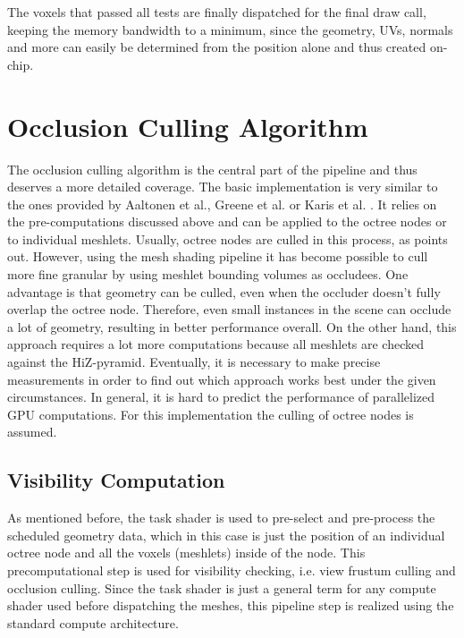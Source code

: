 \noindent
The voxels that passed all tests are finally dispatched for the final draw call, keeping the memory bandwidth to a minimum, 
since the geometry, UVs, normals and more can easily be determined from the position alone and thus created on-chip. \\


\section{Occlusion Culling Algorithm} \label{sec-occlusion}

The occlusion culling algorithm is the central part of the pipeline and thus deserves a more detailed coverage. The 
basic implementation is very similar to the ones provided by Aaltonen et al., Greene et al. or Karis et al. 
\cite{Aaltonen2015,Greene93,Karis2021}. It relies on the pre-computations discussed above and can be applied to the 
octree nodes or to individual meshlets. Usually, octree nodes are culled in this process, as \cite{AkenineMoeller2018}
points out. However, using the mesh shading pipeline it has become possible to cull more fine granular by using 
meshlet bounding volumes as occludees. One advantage is that geometry can be culled, even when the occluder doesn't 
fully overlap the octree node. Therefore, even small instances in the scene can occlude a lot of geometry, resulting 
in better performance overall. On the other hand, this approach requires a lot more computations because all meshlets 
are checked against the \ac{HiZ}-pyramid. Eventually, it is necessary to make precise measurements in order to find out 
which approach works best under the given circumstances. In general, it is hard to predict the performance of 
parallelized \ac{GPU} computations. For this implementation the culling of octree nodes is assumed. 

\subsection*{Visibility Computation} \label{subsec-visibility-computation}

As mentioned before, the task shader is used to pre-select and pre-process the scheduled geometry data, 
which in this case is just the position of an individual octree node and all the voxels (meshlets) inside of the 
node. This precomputational step is used for visibility checking, i.e. view frustum culling and occlusion culling. 
Since the task shader is just a general term for any compute shader used before dispatching the meshes, 
this pipeline step is realized using the standard compute architecture. \\

